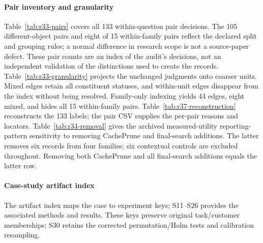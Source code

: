 \paragraph{Pair inventory and granularity}
Table~\ref{tab:r33-pairs} covers all 133 within-question pair decisions. The 105 different-object pairs and eight of 15 within-family pairs reflect the declared split and grouping rules; a normal difference in research scope is not a source-paper defect. These pair counts are an index of the audit's decisions, not an independent validation of the distinctions used to create the records. Table~\ref{tab:r33-granularity} projects the unchanged judgments onto coarser units. Mixed edges retain all constituent statuses, and within-unit edges disappear from the index without being resolved. Family-only indexing yields 44 edges, eight mixed, and hides all 15 within-family pairs. Table~\ref{tab:r37-reconstruction} reconstructs the 133 labels; the pair CSV supplies the per-pair reasons and locators. Table~\ref{tab:r34-removal} gives the archived measured-utility reporting-pattern sensitivity to removing CachePrune and final-search additions. The latter removes six records from four families; six contextual controls are excluded throughout. Removing both CachePrune and all final-search additions equals the latter row.

\paragraph{Case-study artifact index} The artifact index maps the case to experiment keys; S11--S26 provides the associated methods and results. These keys preserve original task/customer memberships; S30 retains the corrected permutation/Holm tests and calibration resampling.
